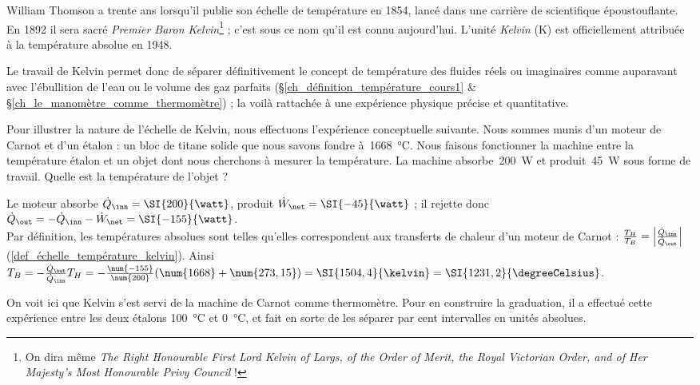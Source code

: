 		William Thomson a trente ans lorsqu’il publie son échelle de température en 1854, lancé dans une carrière de scientifique époustouflante. En 1892 il sera sacré \textit{Premier Baron Kelvin}\footnote{On dira même \textit{The Right Honourable First Lord Kelvin of Largs, of the Order of Merit, the Royal Victorian Order, and of Her Majesty's Most Honourable Privy Council} !} ; c’est sous ce nom qu’il est connu aujourd’hui. L’unité \textit{Kelvin} (\si{\kelvin}) est officiellement attribuée à la température absolue en 1948. 
		
		Le travail de Kelvin permet donc de séparer définitivement le concept de température des fluides réels ou imaginaires comme auparavant avec l’ébullition de l’eau ou le volume des gaz parfaits (\S\ref{ch_définition_température_cours1} \& \S\ref{ch_le_manomètre_comme_thermomètre}) ; la voilà rattachée à une expérience physique précise et quantitative.

		\begin{anexample}
			Pour illustrer la nature de l’échelle de Kelvin, nous effectuons l’expérience conceptuelle suivante. Nous sommes munis d’un moteur de Carnot et d’un étalon : un bloc de titane solide que nous savons fondre à~\SI{1668}{\degreeCelsius}. Nous faisons fonctionner la machine entre la température étalon et un objet dont nous cherchons à mesurer la température. La machine absorbe~\SI{200}{\watt} et produit~\SI{45}{\watt} sous forme de travail. Quelle est la température de l’objet ?
				\begin{answer}
					Le moteur absorbe $\dot Q_\inn = \SI{200}{\watt}$, produit $\dot W_\net = \SI{-45}{\watt}$ ; il rejette donc $\dot Q_\out = - \dot Q_\inn - \dot W_\net = \SI{-155}{\watt}$. \\
					Par définition, les températures absolues sont telles qu’elles correspondent aux transferts de chaleur d’un moteur de Carnot : $\frac{T_H}{T_B} = \left|\frac{\dot Q_\inn}{\dot Q_\out}\right|$ (\ref{def_échelle_température_kelvin}). Ainsi $T_B = -\frac{\dot Q_\out}{\dot Q_\inn} T_H = -\frac{\num{-155}}{\num{200}} (\num{1668} + \num{273,15}) = \SI{1504,4}{\kelvin} = \SI{1231,2}{\degreeCelsius}$. 
				\end{answer}
					\begin{remark}On voit ici que Kelvin s’est servi de la machine de Carnot comme thermomètre. Pour en construire la graduation, il a effectué cette expérience entre les deux étalons \SI{100}{\degreeCelsius} et \SI{0}{\degreeCelsius}, et fait en sorte de les séparer par cent intervalles en unités absolues.\end{remark}
		\end{anexample}


